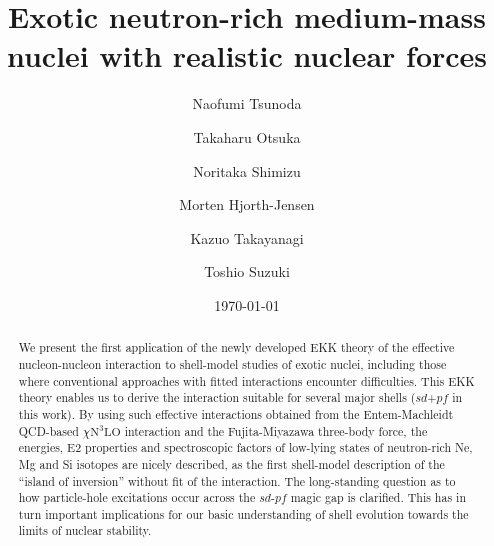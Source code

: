 \documentclass[aps,prl,twocolumn,groupedaddress,showkeys,showpacs,floatfix,superscriptaddress]{revtex4-1}
\newcommand\+{^\dagger}
\newcommand\ntlo{\chi\mathrm{N}^3\mathrm{LO} }
\begin{document}



\title{Exotic neutron-rich medium-mass nuclei with realistic nuclear forces}

\author{Naofumi Tsunoda}
\author{Takaharu Otsuka}
\author{Noritaka Shimizu}
\author{Morten Hjorth-Jensen}
\author{Kazuo Takayanagi}
\author{Toshio Suzuki}

\date{\today}

 \begin{abstract}
  We present the first application of the newly developed EKK theory of the 
  effective nucleon-nucleon interaction to shell-model studies of exotic nuclei, including those 
  where conventional approaches with fitted interactions encounter difficulties.
  This EKK theory enables us to derive the interaction suitable for
  several major shells ($sd$+$pf$ in this work). 
  By using such effective interactions obtained from the Entem-Machleidt QCD-based $\ntlo$ interaction and 
  the Fujita-Miyazawa three-body force, 
  the energies, E2 properties and spectroscopic factors of low-lying states of 
  neutron-rich Ne, Mg and Si isotopes are nicely described, 
  as the first shell-model description
 of the ``island of inversion'' without fit of the interaction.      
  The long-standing question as to how particle-hole excitations occur across the $sd$-$pf$ 
  magic gap is clarified. %
  This has in turn important implications for our basic understanding of shell evolution towards the limits of nuclear stability.
\end{abstract}
\end{document}
